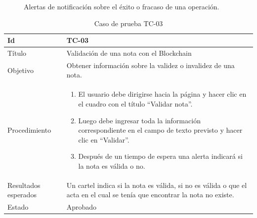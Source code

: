 \begin{figure}[H]
    \caption{Alertas de notificación sobre el éxito o fracaso de una operación.}
    \label{fig:query_failure}
\end{figure}

\begin{table}[H]
\begin{tabularx}{\textwidth}{|m{3cm}|X|}
\hline
Id & TC-03\\
\hline
Título & Validación de una nota con el Blockchain \\
\hline
Objetivo & Obtener información sobre la validez o invalidez de una nota.\\
\hline
Procedimiento & \begin{enumerate}
    \item El usuario debe dirigirse hacia la página y hacer clic en el cuadro con el título ``Validar nota''.
    \item Luego debe ingresar toda la información correspondiente en el campo de texto previsto y hacer clic en ``Validar''.
    \item Después de un tiempo de espera una alerta indicará si la nota es válida o no.
\end{enumerate}\\
\hline
Resultados esperados & Un cartel indica si la nota es válida, si no es válida o que el acta en el cual se tenía que encontrar la nota no existe.\\
\hline
Estado & Aprobado\\
\hline
\end{tabularx}
\caption{Caso de prueba TC-03}
\end{table}

